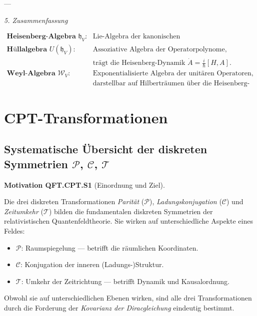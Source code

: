 \documentclass[10pt, letterpaper]{article}
\newcommand{\CustomHeading}[3]{%
  \par\medskip\noindent%
  \textbf{#1 #2} \textnormal{(#3)}.\enskip%
}
\newenvironment{MOT}[2]{\begin{unitbox}\CustomHeading{Motivation}{#1}{#2}}{\end{unitbox}}
\begin{document}
---

\emph{5. Zusammenfassung}

\[
\boxed{
\begin{aligned}
\textbf{Heisenberg-Algebra } \mathfrak{h}_V: &\ \text{Lie-Algebra der kanonischen Kommutationsrelationen.}\\[4pt]
\textbf{Hüllalgebra } U(\mathfrak{h}_V): &\ \text{Assoziative Algebra der Operatorpolynome,}\\
&\ \text{trägt die Heisenberg-Dynamik } \dot{A}=\tfrac{i}{\hbar}[H,A].\\[4pt]
\textbf{Weyl-Algebra } \mathcal{W}_V: &\ \text{Exponentialisierte Algebra der unitären Operatoren,}\\
&\ \text{darstellbar auf Hilberträumen über die Heisenberg-Gruppe.}
\end{aligned}
}
\]



\pagebreak

\section{CPT-Transformationen}


\subsection{Systematische Übersicht der diskreten Symmetrien $\mathcal P$, $\mathcal C$, $\mathcal T$}

\begin{MOT}{QFT.CPT.S1}{Einordnung und Ziel}
Die drei diskreten Transformationen \emph{Parität} ($\mathcal P$), \emph{Ladungskonjugation} ($\mathcal C$) und \emph{Zeitumkehr} ($\mathcal T$) bilden die fundamentalen diskreten Symmetrien der relativistischen Quantenfeldtheorie.  
Sie wirken auf unterschiedliche Aspekte eines Feldes:
\begin{itemize}
  \item $\mathcal P$: Raumspiegelung — betrifft die räumlichen Koordinaten.
  \item $\mathcal C$: Konjugation der inneren (Ladungs-)Struktur.
  \item $\mathcal T$: Umkehr der Zeitrichtung — betrifft Dynamik und Kausalordnung.
\end{itemize}
Obwohl sie auf unterschiedlichen Ebenen wirken, sind alle drei Transformationen durch die Forderung der \emph{Kovarianz der Diracgleichung} eindeutig bestimmt.
\end{MOT}
\end{document}
